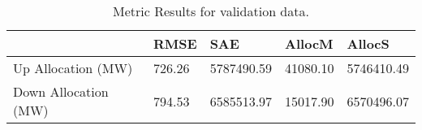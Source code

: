 \begin{table}[H] 
    \caption{Metric Results for validation data. \label{validation_res}}
    \begin{tabularx}{\textwidth}{CCCCC}
    \toprule
    & \textbf{RMSE}	& \textbf{SAE}	& \textbf{AllocM} & \textbf{AllocS}\\
    \midrule
    Up Allocation (MW) & 726.26 & 5787490.59 & 41080.10 & 5746410.49 \\
    Down Allocation (MW) & 794.53 & 6585513.97 & 15017.90 & 6570496.07 \\
        \bottomrule
    \end{tabularx}
\end{table}

